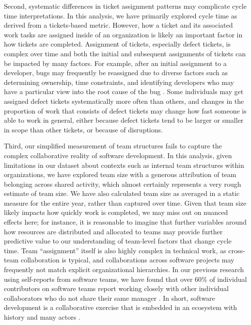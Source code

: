 \documentclass[manuscript,screen,review]{acmart}
\begin{document}
Second, systematic differences in ticket assignment patterns may
complicate cycle time interpretations. In this analysis, we have
primarily explored cycle time as derived from a tickets-based metric.
However, how a ticket and its associated work tasks are assigned inside
of an organization is likely an important factor in how tickets are
completed. Assignment of tickets, especially defect tickets, is complex
over time and both the initial and subsequent assignments of tickets can
be impacted by many factors. For example, after an initial assignment to
a developer, bugs may frequently be reassigned due to diverse factors
such as determining ownership, time constraints, and identifying
developers who may have a particular view into the root cause of the bug
\citep{guoNotMyBug2011}. Some individuals may get assigned defect
tickets systematically more often than others, and changes in the
proportion of work that consists of defect tickets may change how fast
someone is able to work in general, either because defect tickets tend
to be larger or smaller in scope than other tickets, or because of
disruptions.

Third, our simplified measurement of team structures fails to capture
the complex collaborative reality of software development. In this
analysis, given limitations in our dataset about contexts such as
internal team structures within organizations, we have explored team
size with a generous attribution of team belonging across shared
activity, which almost certainly represents a very rough estimate of
team size. We have also calculated team size as averaged in a static
measure for the entire year, rather than captured over time. Given that
team size likely impacts how quickly work is completed, we may miss out
on nuanced effects here; for instance, it is reasonable to imagine that
further variables around how resources are distributed and allocated to
teams may provide further predictive value to our understanding of
team-level factors that change cycle time. Team ``assignment'' itself is
also highly complex in technical work, as cross-team collaboration is
typical, and collaborations across software projects may frequently not
match explicit organizational hierarchies. In our previous research
using self-reports from software teams, we have found that over 60\% of
individual contributors on software teams report working closely with
other individual collaborators who do not share their same manager
\citep{hicksDeveloperThrivingFour2023}. In short, software development
is a collaborative exercise that is embedded in an ecosystem with
history and many actors \citep{hicksCumulativeCultureTheory2024}.
\end{document}
